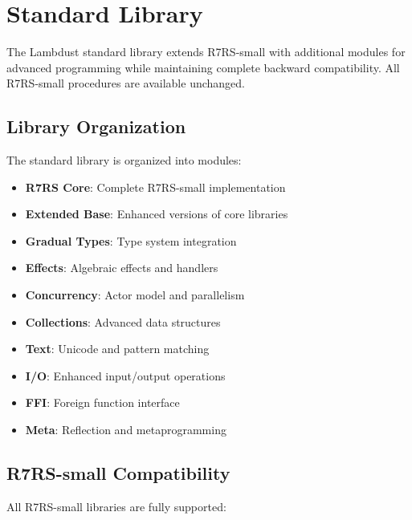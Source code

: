\chapter{Standard Library}
\label{ch:stdlib}

The Lambdust standard library extends R7RS-small with additional modules for advanced programming while maintaining complete backward compatibility. All R7RS-small procedures are available unchanged.

\section{Library Organization}
\label{sec:library-organization}

The standard library is organized into modules:

\begin{itemize}
\item \textbf{R7RS Core}: Complete R7RS-small implementation
\item \textbf{Extended Base}: Enhanced versions of core libraries
\item \textbf{Gradual Types}: Type system integration
\item \textbf{Effects}: Algebraic effects and handlers
\item \textbf{Concurrency}: Actor model and parallelism
\item \textbf{Collections}: Advanced data structures
\item \textbf{Text}: Unicode and pattern matching
\item \textbf{I/O}: Enhanced input/output operations
\item \textbf{FFI}: Foreign function interface
\item \textbf{Meta}: Reflection and metaprogramming
\end{itemize}

\section{R7RS-small Compatibility}
\label{sec:r7rs-compatibility}


All R7RS-small libraries are fully supported:

